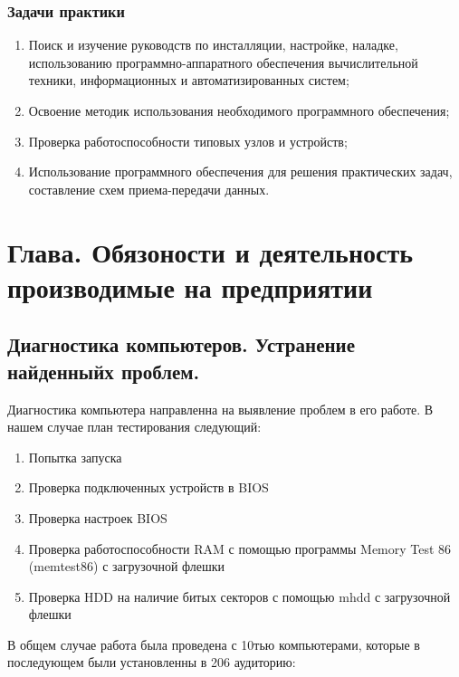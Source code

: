\documentclass[14pt, oneside]{altsu-report}
\begin{document}
\subsection*{Задачи практики}
\begin{enumerate}
  \item  Поиск и изучение руководств по инсталляции, настройке, наладке, использованию программно-аппаратного обеспечения вычислительной техники, информационных и автоматизированных систем;
  \item  Освоение методик использования необходимого программного обеспечения;
  \item  Проверка работоспособности типовых узлов и устройств;
  \item  Использование программного обеспечения для решения практических задач, составление схем приема-передачи данных.
\end{enumerate}



\chapter{Глава. Обязоности и деятельность производимые на предприятии}
\section{Диагностика компьютеров. Устранение найденныйх проблем.}
Диагностика компьютера направленна на выявление проблем в его работе. В нашем случае план тестирования следующий:
\begin{enumerate}
  \item Попытка запуска
  \item Проверка подключенных устройств в BIOS
  \item Проверка настроек BIOS
  \item Проверка работоспособности RAM с помощью программы Memory Test 86 (memtest86) \cite{memtest} с загрузочной флешки
  \item Проверка HDD на наличие битых секторов с помощью mhdd \cite{mhdd} с загрузочной флешки
\end{enumerate}

В общем случае работа была проведена с 10тью компьютерами, которые в последующем были установленны в 206 аудиторию:
\end{document}
